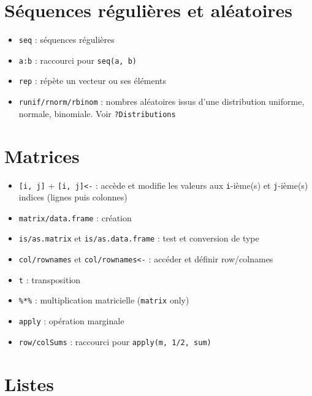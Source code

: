 \documentclass[
  letterpaper,
  DIV=11,
  numbers=noendperiod]{scrreprt}
\providecommand{\tightlist}{%
  \setlength{\itemsep}{0pt}\setlength{\parskip}{0pt}}\usepackage{longtable,booktabs,array}
\begin{document}
\hypertarget{suxe9quences-ruxe9guliuxe8res-et-aluxe9atoires}{%
\section{Séquences régulières et
aléatoires}\label{suxe9quences-ruxe9guliuxe8res-et-aluxe9atoires}}

\begin{itemize}
\tightlist
\item
  \texttt{seq} : séquences régulières
\item
  \texttt{a:b} : raccourci pour \texttt{seq(a,\ b)}
\item
  \texttt{rep} : répète un vecteur ou ses éléments
\item
  \texttt{runif/rnorm/rbinom} : nombres aléatoires issus d'une
  distribution uniforme, normale, binomiale. Voir
  \texttt{?Distributions}
\end{itemize}

\hypertarget{matrices}{%
\section{Matrices}\label{matrices}}

\begin{itemize}
\tightlist
\item
  \texttt{{[}i,\ j{]}} + \texttt{{[}i,\ j{]}\textless{}-} : accède et
  modifie les valeurs aux \texttt{i}-ième(s) et \texttt{j}-ième(s)
  indices (lignes puis colonnes)
\item
  \texttt{matrix/data.frame} : création
\item
  \texttt{is/as.matrix} et \texttt{is/as.data.frame} : test et
  conversion de type
\item
  \texttt{col/rownames} et \texttt{col/rownames\textless{}-} : accéder
  et définir row/colnames
\item
  \texttt{t} : transposition
\item
  \texttt{\%*\%} : multiplication matricielle (\texttt{matrix} only)
\item
  \texttt{apply} : opération marginale
\item
  \texttt{row/colSums} : raccourci pour \texttt{apply(m,\ 1/2,\ sum)}
\end{itemize}

\hypertarget{listes}{%
\section{Listes}\label{listes}}
\end{document}
